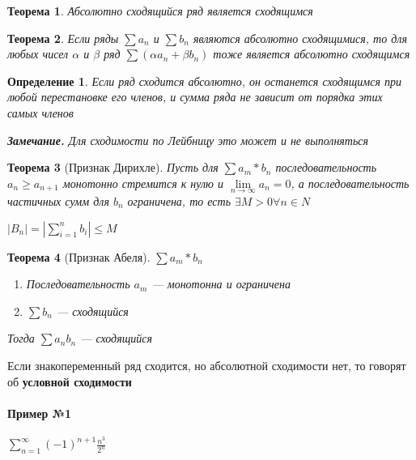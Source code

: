 \documentclass{article}
\newtheorem{definition}{Определение}
\newtheorem{theorem}{Теорема}
\begin{document}
\begin{theorem}

Абсолютно сходящийся ряд является сходящимся

\end{theorem}

\begin{theorem}

Если ряды $\sum a_{n}$ и $\sum b_{n}$ являются абсолютно сходящимися, то для любых чисел $\alpha$ и $\beta$ ряд $\sum (\alpha a_n + \beta b_n)$ тоже является абсолютно сходящимся

\end{theorem}

\begin{definition}

Если ряд сходится абсолютно, он останется сходящимся при любой перестановке его членов, и сумма ряда не зависит от порядка этих самых членов

\textbf{Замечание.} Для сходимости по Лейбницу это может и не выполняться

\end{definition}

\begin{theorem}[Признак Дирихле]

Пусть для $\sum a_{m} * b_{n}$ последовательность $a_{n} \ge a_{n + 1}$ монотонно стремится к нулю и $\lim\limits_{n \to \infty} a_{n} = 0$, а последовательность частичных сумм для $b_n$ ограничена, то есть $\exists M > 0 \forall n \in N$

$|B_{n}| = |\sum\limits_{i = 1}^{n} b_i| \le M$

\end{theorem}

\begin{theorem}[Признак Абеля]

$\sum a_{m} * b_{n}$

\begin{enumerate}
    \item Последовательность ${ a_m }$ — монотонна и ограничена
    \item $\sum b_{n}$ — сходящийся
\end{enumerate}

Тогда $\sum a_{n} b_{n}$ — сходящийся

\end{theorem}

Если знакопеременный ряд сходится, но абсолютной сходимости нет, то говорят об \textbf{условной сходимости}

\paragraph{Пример №1} $\sum\limits_{n = 1}^{\infty} (-1)^{n + 1} \frac{n^3}{2^{n}}$
\end{document}
